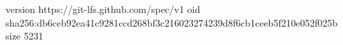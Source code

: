 version https://git-lfs.github.com/spec/v1
oid sha256:db6ceb92ea41c9281ccd268bf3c216023274239d8f6cb1ceeb5f210e052f025b
size 5231
